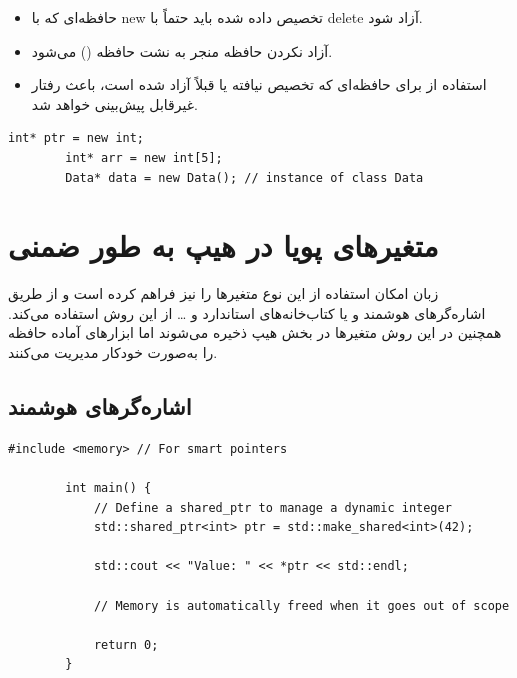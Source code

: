 \documentclass[12pt, a4paper]{report}
\begin{document}
\begin{itemize}
	\item حافظه‌ای که با new تخصیص داده شده باید حتماً با delete آزاد شود.
	\item آزاد نکردن حافظه منجر به نشت حافظه () می‌شود.
	\item استفاده از  برای حافظه‌ای که تخصیص نیافته یا قبلاً آزاد شده است، باعث رفتار غیرقابل پیش‌بینی خواهد شد.
\end{itemize}


\begin{LTR} %
	\begin{lstlisting}[breaklines=true]
		int* ptr = new int;
		int* arr = new int[5];
		Data* data = new Data(); // instance of class Data
	\end{lstlisting}
\end{LTR}


\section{متغیرهای پویا در هیپ به طور ضمنی}

زبان  امکان استفاده از این نوع متغیرها را نیز فراهم کرده است و از طریق اشاره‌گر‌های هوشمند و یا کتاب‌خانه‌های استاندارد و … از این روش استفاده می‌کند. همچنین در این روش متغیر‌ها در بخش هیپ ذخیره می‌شوند اما ابزار‌های آماده حافظه را به‌‌صورت خودکار مدیریت می‌‌‌کنند.


\subsection{اشاره‌گرهای هوشمند}


\begin{LTR} %
	\begin{lstlisting}[breaklines=true]
		#include <memory> // For smart pointers
		
		int main() {
			// Define a shared_ptr to manage a dynamic integer
			std::shared_ptr<int> ptr = std::make_shared<int>(42);
			
			std::cout << "Value: " << *ptr << std::endl;
			
			// Memory is automatically freed when it goes out of scope
			
			return 0;
		}
	\end{lstlisting}
\end{LTR}
\end{document}
